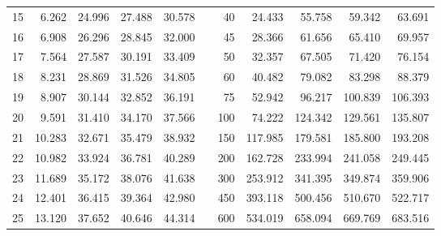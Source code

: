 \begin{tabular}{@{}rrrrrcrrrrr@{}}
15 & 6.262 & 24.996 & 27.488 & 30.578 & \hspace{4pt} & 40 & 24.433 & 55.758 & 59.342 & 63.691 \\
16 & 6.908 & 26.296 & 28.845 & 32.000 & \hspace{4pt} & 45 & 28.366 & 61.656 & 65.410 & 69.957 \\
17 & 7.564 & 27.587 & 30.191 & 33.409 & \hspace{4pt} & 50 & 32.357 & 67.505 & 71.420 & 76.154 \\
18 & 8.231 & 28.869 & 31.526 & 34.805 & \hspace{4pt} & 60 & 40.482 & 79.082 & 83.298 & 88.379 \\
19 & 8.907 & 30.144 & 32.852 & 36.191 & \hspace{4pt} & 75 & 52.942 & 96.217 & 100.839 & 106.393 \\
20 & 9.591 & 31.410 & 34.170 & 37.566 & \hspace{4pt} & 100 & 74.222 & 124.342 & 129.561 & 135.807 \\
21 & 10.283 & 32.671 & 35.479 & 38.932 & \hspace{4pt} & 150 & 117.985 & 179.581 & 185.800 & 193.208 \\
22 & 10.982 & 33.924 & 36.781 & 40.289 & \hspace{4pt} & 200 & 162.728 & 233.994 & 241.058 & 249.445 \\
23 & 11.689 & 35.172 & 38.076 & 41.638 & \hspace{4pt} & 300 & 253.912 & 341.395 & 349.874 & 359.906 \\
24 & 12.401 & 36.415 & 39.364 & 42.980 & \hspace{4pt} & 450 & 393.118 & 500.456 & 510.670 & 522.717 \\
25 & 13.120 & 37.652 & 40.646 & 44.314 & \hspace{4pt} & 600 & 534.019 & 658.094 & 669.769 & 683.516 \\
\bottomrule
\end{tabular}
